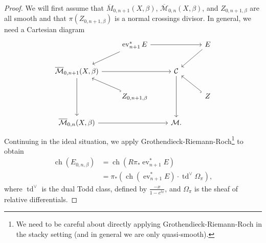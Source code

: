 \documentclass[leqno, openany]{memoir}
\theoremstyle{definition}
\theoremstyle{remark}
\theoremstyle{plain}
\theoremstyle{definition}
\theoremstyle{remark}
\newcommand{\mc}[1]{\mathcal{#1}}
\newcommand{\on}[1]{\operatorname{#1}}
\newcommand{\ol}[1]{\overline{#1}}
\newcommand{\Mbar}{\overline{\mathcal{M}}}
\DeclareMathOperator{\ch}{ch}
\DeclareMathOperator{\ev}{ev}
\begin{document}
\begin{proof}
    We will first assume that $\ol{M}_{0,n+1}(X,\beta)$, $\Mbar_{0,n}(X,\beta)$, and $Z_{0,n+1,\beta}$ are all smooth and that $\pi(Z_{0,n+1,\beta})$ is a normal crossings divisor. In general, we need a Cartesian diagram
    \begin{equation*}
    \begin{tikzcd}
        & \ev_{n+1}^* E \ar{rr} \ar{dl} & & E \ar{dl} \\
        \Mbar_{0,n+1}(X,\beta) \ar{rr} \ar{dd} & & \mc{C} \ar{dd} \\
        & Z_{0,n+1,\beta} \ar[hookrightarrow]{ul} & & Z \ar[hookrightarrow]{ul} \\
        \Mbar_{0,n}(X,\beta) \ar{rr} & & \mc{M}.
    \end{tikzcd}
    \end{equation*}
    Continuing in the ideal situation, we apply Grothendieck-Riemann-Roch\footnote{We need to be careful about directly applying Grothendieck-Riemann-Roch in the stacky setting (and in general we are only quasi-smooth).} to obtain
    \begin{align*}
        \ch(E_{0,n,\beta}) &= \ch(R \pi_* \ev_{n+1}^* E) \\
        &= \pi_* (\ch(\ev_{n+1}^* E) \cdot \on{td}^{\vee} \Omega_{\pi}),
    \end{align*}
    where $\on{td}^{\vee}$ is the dual Todd class, defined by $\frac{-x}{1-e^{tx}}$, and $\Omega_{\pi}$ is the sheaf of relative differentials.


\end{proof}
\end{document}
